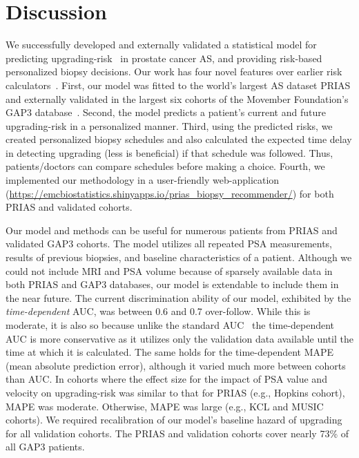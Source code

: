 \section{Discussion}
We successfully developed and externally validated a statistical model for predicting upgrading-risk~\citep{bruinsma2017expert} in prostate cancer AS, and providing risk-based personalized biopsy decisions. Our work has four novel features over earlier risk calculators~\citep{coley2017prediction,ankerst2015precision}. First, our model was fitted to the world's largest AS dataset PRIAS and externally validated in the largest six cohorts of the Movember Foundation's GAP3 database~\citep{gap3_2018}. Second, the model predicts a patient's current and future upgrading-risk in a personalized manner. Third, using the predicted risks, we created personalized biopsy schedules and also calculated the expected time delay in detecting upgrading (less is beneficial) if that schedule was followed. Thus, patients/doctors can compare schedules before making a choice. Fourth, we implemented our methodology in a user-friendly web-application (\url{https://emcbiostatistics.shinyapps.io/prias_biopsy_recommender/}) for both PRIAS and validated cohorts.

Our model and methods can be useful for numerous patients from PRIAS and validated GAP3 cohorts. The model utilizes all repeated PSA measurements, results of previous biopsies, and baseline characteristics of a patient. Although we could not include MRI and PSA volume because of sparsely available data in both PRIAS and GAP3 databases, our model is extendable to include them in the near future. The current discrimination ability of our model, exhibited by the \textit{time-dependent} AUC, was between 0.6 and 0.7 over-follow. While this is moderate, it is also so because unlike the standard AUC~\citep{steyerberg2010assessing} the time-dependent AUC is more conservative as it utilizes only the validation data available until the time at which it is calculated. The same holds for the time-dependent MAPE (mean absolute prediction error), although it varied much more between cohorts than AUC. In cohorts where the effect size for the impact of PSA value and velocity on upgrading-risk was similar to that for PRIAS (e.g., Hopkins cohort), MAPE was moderate. Otherwise, MAPE was large (e.g., KCL and MUSIC cohorts). We required recalibration of our model's baseline hazard of upgrading for all validation cohorts. The PRIAS and validation cohorts cover nearly 73\% of all GAP3 patients.

